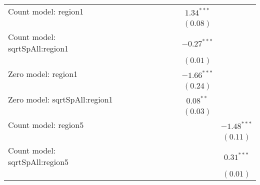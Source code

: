 \begin{center}
\begin{longtable}{l c c c c c c c c c}
Count model: region1           &               &               &               &               &                 &                 &               & $1.34^{***}$   &               \\
                               &               &               &               &               &                 &                 &               & $(0.08)$       &               \\
Count model: sqrtSpAll:region1 &               &               &               &               &                 &                 &               & $-0.27^{***}$  &               \\
                               &               &               &               &               &                 &                 &               & $(0.01)$       &               \\
Zero model: region1            &               &               &               &               &                 &                 &               & $-1.66^{***}$  &               \\
                               &               &               &               &               &                 &                 &               & $(0.24)$       &               \\
Zero model: sqrtSpAll:region1  &               &               &               &               &                 &                 &               & $0.08^{**}$    &               \\
                               &               &               &               &               &                 &                 &               & $(0.03)$       &               \\
Count model: region5           &               &               &               &               &                 &                 &               &                & $-1.48^{***}$ \\
                               &               &               &               &               &                 &                 &               &                & $(0.11)$      \\
Count model: sqrtSpAll:region5 &               &               &               &               &                 &                 &               &                & $0.31^{***}$  \\
                               &               &               &               &               &                 &                 &               &                & $(0.01)$      \\

\end{longtable}
\end{center}
